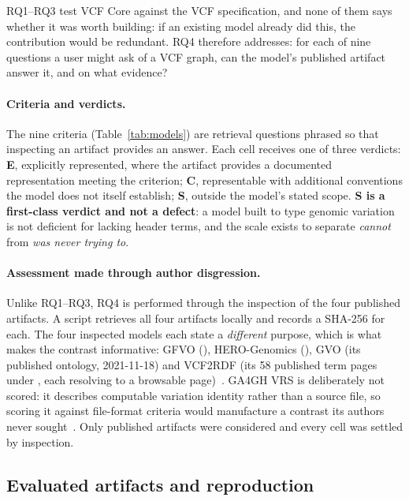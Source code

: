 RQ1--RQ3 test VCF Core against the VCF specification, and none of them says whether it was worth building: if an existing model already did this, the contribution would be redundant.
RQ4 therefore addresses: for each of nine questions a user might ask of a VCF graph, can the model's published artifact answer it, and on what evidence?

\paragraph{Criteria and verdicts.}
The nine criteria (Table~\ref{tab:models}) are retrieval questions phrased so that inspecting an artifact provides an answer.
Each cell receives one of three verdicts: \textbf{E}, explicitly represented, where the artifact provides a documented representation meeting the criterion; \textbf{C}, representable with additional conventions the model does not itself establish; \textbf{S}, outside the model's stated scope.
\textbf{S is a first-class verdict and not a defect}: a model built to type genomic variation is not deficient for lacking header terms, and the scale exists to separate \emph{cannot} from \emph{was never trying to}.

\paragraph{Assessment made through author disgression.}
Unlike RQ1--RQ3, RQ4 is performed through the inspection of the four published artifacts.
A script  retrieves all four artifacts locally and records a SHA-256 for each.
The four inspected models each state a \emph{different} purpose, which is what makes the contrast informative: GFVO (), HERO-Genomics (), GVO (its published ontology,  2021-11-18) and VCF2RDF (its 58 published term pages under , each resolving to a browsable page)~\cite{baran2015gfvo,cazzaro2025hero,kawashima2023gvo,penha2017vcf2rdf}.
GA4GH VRS is deliberately not scored: it describes computable variation identity rather than a source file, so scoring it against file-format criteria would manufacture a contrast its authors never sought~\cite{wagner2021vrs}.
Only published artifacts were considered and every cell was settled by inspection.

\subsection{Evaluated artifacts and reproduction}
\label{sec:reproduction}

